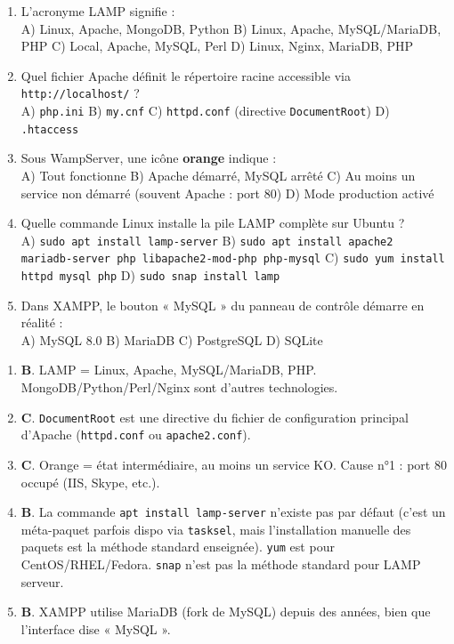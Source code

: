 \documentclass[11pt]{article}
\begin{document}
\begin{exercice}
\begin{enumerate}
\item L'acronyme LAMP signifie : \\
A) Linux, Apache, MongoDB, Python \quad B) Linux, Apache, MySQL/MariaDB, PHP \quad C) Local, Apache, MySQL, Perl \quad D) Linux, Nginx, MariaDB, PHP
\item Quel fichier Apache définit le répertoire racine accessible via \texttt{http://localhost/} ? \\
A) \texttt{php.ini} \quad B) \texttt{my.cnf} \quad C) \texttt{httpd.conf} (directive \texttt{DocumentRoot}) \quad D) \texttt{.htaccess}
\item Sous WampServer, une icône \textbf{orange} indique : \\
A) Tout fonctionne \quad B) Apache démarré, MySQL arrêté \quad C) Au moins un service non démarré (souvent Apache : port 80) \quad D) Mode production activé
\item Quelle commande Linux installe la pile LAMP complète sur Ubuntu ? \\
A) \texttt{sudo apt install lamp-server} \quad B) \texttt{sudo apt install apache2 mariadb-server php libapache2-mod-php php-mysql} \quad C) \texttt{sudo yum install httpd mysql php} \quad D) \texttt{sudo snap install lamp}
\item Dans XAMPP, le bouton « MySQL » du panneau de contrôle démarre en réalité : \\
A) MySQL 8.0 \quad B) MariaDB \quad C) PostgreSQL \quad D) SQLite
\end{enumerate}
\end{exercice}

\begin{corrige}
\begin{enumerate}
\item \textbf{B}. LAMP = Linux, Apache, MySQL/MariaDB, PHP. MongoDB/Python/Perl/Nginx sont d'autres technologies.
\item \textbf{C}. \texttt{DocumentRoot} est une directive du fichier de configuration principal d'Apache (\texttt{httpd.conf} ou \texttt{apache2.conf}).
\item \textbf{C}. Orange = état intermédiaire, au moins un service KO. Cause n°1 : port 80 occupé (IIS, Skype, etc.).
\item \textbf{B}. La commande \texttt{apt install lamp-server} n'existe pas par défaut (c'est un méta-paquet parfois dispo via \texttt{tasksel}, mais l'installation manuelle des paquets est la méthode standard enseignée). \texttt{yum} est pour CentOS/RHEL/Fedora. \texttt{snap} n'est pas la méthode standard pour LAMP serveur.
\item \textbf{B}. XAMPP utilise MariaDB (fork de MySQL) depuis des années, bien que l'interface dise « MySQL ».
\end{enumerate}
\end{corrige}
\end{document}
